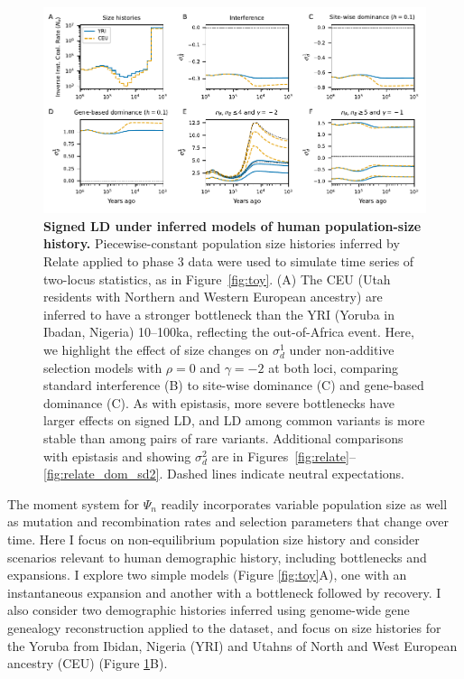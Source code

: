 \documentclass[]{article}
\begin{document}
\begin{figure}[tb!]
    \centering
    \includegraphics{../figures/demog_YRI_CEU.dominance}
    \caption{
        \textbf{Signed LD under inferred models of human population-size history.}
        Piecewise-constant population size histories inferred by Relate applied to
        \citet{1000_Genomes_Project_Consortium2015-zq} phase 3 data were used to
        simulate time series of two-locus statistics, as in Figure~\ref{fig:toy}.
        (A) The CEU (Utah residents with Northern and Western European ancestry)
        are inferred to have a stronger bottleneck than the YRI
        (Yoruba in Ibadan, Nigeria) 10--100ka, reflecting the out-of-Africa
        event.
        Here, we highlight the effect of size changes on \(\sigma_d^1\) under
        non-additive selection models with \(\rho=0\) and \(\gamma=-2\) at both loci,
        comparing standard interference (B) to site-wise dominance (C) and gene-based
        dominance (C).
        As with epistasis, more severe bottlenecks have larger effects on signed LD,
        and LD among common variants is more stable than among pairs of rare variants.
        Additional comparisons with epistasis and showing \(\sigma_d^2\) are
        in Figures~\ref{fig:relate}--\ref{fig:relate_dom_sd2}.
        Dashed lines indicate neutral expectations.
    }
    \label{fig:relate_dom}
\end{figure}

The moment system for \(\Psi_n\) readily incorporates variable population size as
well as mutation and recombination rates and selection parameters that change
over time. Here I focus on non-equilibrium population size history and consider
scenarios relevant to human demographic history, including bottlenecks and
expansions. I explore two simple models (Figure \ref{fig:toy}A), one with an
instantaneous expansion and another with a bottleneck followed by recovery. I
also consider two demographic histories inferred using genome-wide gene
genealogy reconstruction \citep{Speidel2019-nj} applied to the
\citet{1000_Genomes_Project_Consortium2015-zq} dataset, and focus on size histories
for the Yoruba from Ibidan, Nigeria (YRI) and Utahns of North and West European
ancestry (CEU) (Figure \ref{fig:relate_dom}B).
\end{document}
